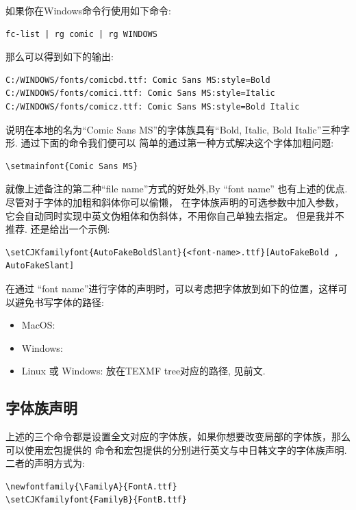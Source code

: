 如果你在Windows命令行使用如下命令:
\begin{verbatim}
fc-list | rg comic | rg WINDOWS
\end{verbatim}

那么可以得到如下的输出:
\begin{verbatim}
C:/WINDOWS/fonts/comicbd.ttf: Comic Sans MS:style=Bold
C:/WINDOWS/fonts/comici.ttf: Comic Sans MS:style=Italic
C:/WINDOWS/fonts/comicz.ttf: Comic Sans MS:style=Bold Italic
\end{verbatim}

说明在本地的名为``Comic Sans MS''的字体族具有``Bold, Italic, Bold Italic''三种字形. 通过下面的命令我们便可以
简单的通过第一种方式解决这个字体加粗问题:
\begin{verbatim}
\setmainfont{Comic Sans MS}
\end{verbatim}

\begin{leftbar}%
就像上述备注的第二种``file name''方式的好处外,By ``font name'' 也有上述的优点. 尽管对于字体的加粗和斜体你可以偷懒，
在字体族声明的可选参数中加入参数，它会自动同时实现中英文伪粗体和伪斜体，不用你自己单独去指定。
但是我并不推荐. 还是给出一个示例:
\end{leftbar}

\begin{verbatim}
\setCJKfamilyfont{AutoFakeBoldSlant}{<font-name>.ttf}[AutoFakeBold , AutoFakeSlant]
\end{verbatim}

在通过 ``font name''进行字体的声明时，可以考虑把字体放到如下的位置，这样可以避免书写字体的路径:
\begin{itemize}
    \item MacOS:
    \item Windows:
    \item Linux 或 Windows: 放在TEXMF tree对应的路径, 见前文.
\end{itemize}

\subsection{字体族声明}
上述的三个命令都是设置全文对应的字体族，如果你想要改变局部的字体族，那么可以使用宏包提供的
命令\cmd{\newfontfamily}和宏包提供的\cmd{\setCJKfamilyfont}分别进行英文与中日韩文字的字体族声明.
二者的声明方式为:
\begin{verbatim}
\newfontfamily{\FamilyA}{FontA.ttf}
\setCJKfamilyfont{FamilyB}{FontB.ttf}
\end{verbatim}

